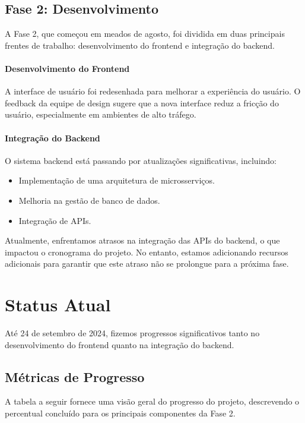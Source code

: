 \documentclass[12pt]{article}
\begin{document}
\subsection{Fase 2: Desenvolvimento}
A Fase 2, que começou em meados de agosto, foi dividida em duas principais frentes de trabalho: desenvolvimento do frontend e integração do backend.

\paragraph{Desenvolvimento do Frontend} A interface de usuário foi redesenhada para melhorar a experiência do usuário. O feedback da equipe de design sugere que a nova interface reduz a fricção do usuário, especialmente em ambientes de alto tráfego.

\paragraph{Integração do Backend} O sistema backend está passando por atualizações significativas, incluindo:
\begin{itemize}
    \item Implementação de uma arquitetura de microsserviços.
    \item Melhoria na gestão de banco de dados.
    \item Integração de APIs.
\end{itemize}

Atualmente, enfrentamos atrasos na integração das APIs do backend, o que impactou o cronograma do projeto. No entanto, estamos adicionando recursos adicionais para garantir que este atraso não se prolongue para a próxima fase.

\section{Status Atual}
Até 24 de setembro de 2024, fizemos progressos significativos tanto no desenvolvimento do frontend quanto na integração do backend.

\subsection{Métricas de Progresso}
A tabela a seguir fornece uma visão geral do progresso do projeto, descrevendo o percentual concluído para os principais componentes da Fase 2.
\end{document}
